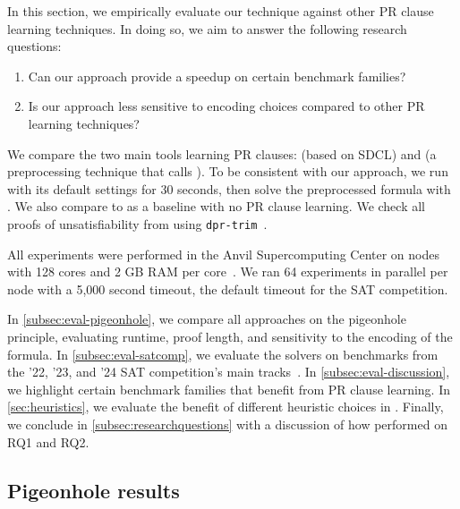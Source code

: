 In this section, we empirically evaluate our technique against other PR clause
learning techniques. In doing so, we aim to answer the following research
questions:


\begin{enumerate}[label={RQ\arabic*}]
    \item Can our approach provide a speedup on certain benchmark families?
    \item Is our approach less sensitive to encoding choices compared to other
    PR learning techniques?
\end{enumerate}


We compare the two main tools learning PR clauses: \sadical (based on SDCL) and
\prelearn (a preprocessing technique that calls \sadical). To be consistent with
our approach, we run \prelearn with its default settings for 30 seconds, then
solve the preprocessed formula with \cadical. We also compare to \cadical as a
baseline with no PR clause learning. We check all proofs of unsatisfiability
from \tool using \texttt{dpr-trim}~\cite{dpr-trim}.

All experiments were performed in the Anvil Supercomputing Center on nodes with
128 cores and 2 GB RAM per core~\cite{anvil}. We ran 64 experiments in parallel
per node with a 5,000 second timeout, the default timeout for the SAT
competition.

In \autoref{subsec:eval-pigeonhole}, we compare all approaches on the pigeonhole
principle, evaluating runtime, proof length, and sensitivity to the encoding of
the formula. In \autoref{subsec:eval-satcomp}, we evaluate the solvers on
benchmarks from the '22, '23, and '24 SAT competition's main
tracks~\cite{satcomp2022,satcomp2023,satcomp2024}. In
\autoref{subsec:eval-discussion}, we highlight certain benchmark families that
benefit from PR clause learning. In \autoref{sec:heuristics}, we evaluate the 
benefit of different heuristic choices in \tool. Finally, we conclude in 
\autoref{subsec:researchquestions} with a discussion of how performed on RQ1 and 
RQ2.



\subsection{Pigeonhole results}~\label{subsec:eval-pigeonhole}


